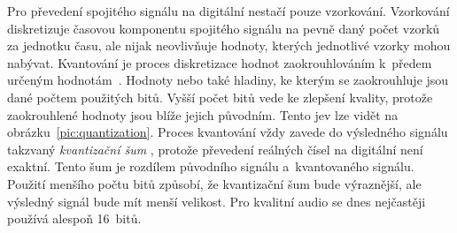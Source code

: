 Pro převedení spojitého signálu na digitální nestačí pouze vzorkování.
Vzorkování diskretizuje časovou komponentu spojitého signálu na pevně daný
počet vzorků za jednotku času, ale nijak neovlivňuje hodnoty, kterých
jednotlivé vzorky mohou nabývat. Kvantování je proces diskretizace hodnot
zaokrouhlováním k~předem určeným hodnotám~\cite{Oliver1948}. Hodnoty nebo také
hladiny, ke kterým se zaokrouhluje jsou dané počtem použitých bitů. Vyšší počet
bitů vede ke zlepšení kvality, protože zaokrouhlené hodnoty jsou blíže jejich
původním. Tento jev lze vidět na obrázku~\ref{pic:quantization}. Proces
kvantování vždy zavede do výsledného signálu takzvaný \textit{kvantizační šum}
\cite{Oliver1948}, protože převedení reálných čísel na digitální není exaktní.
Tento šum je rozdílem původního signálu a~kvantovaného signálu. Použití menšího
počtu bitů způsobí, že kvantizační šum bude výraznější, ale výsledný signál
bude mít menší velikost. Pro kvalitní audio se dnes nejčastěji používá alespoň
16~bitů.

